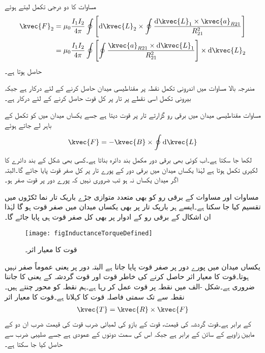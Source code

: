 مساوات  کا دو درجی تکمل لیتے ہوئے
\begin{gather}
 \begin{aligned}\label{مساوات_امالہ_تاروں_کے_مابین_قوت}
\kvec{F}_2 &=\mu_0 \frac{I_1 I_2}{4\pi } \oint\left[\dif \kvec{L}_2 \times \oint\frac{\dif \kvec{L}_1 \times \kvec{a}_{R21}}{R_{21}^2}\right]\\
&=\mu_0 \frac{I_1 I_2}{4\pi } \oint\left[ \oint\frac{ \kvec{a}_{R21}\times \dif \kvec{L}_1}{R_{21}^2}\right] \times \dif \kvec{L}_2
\end{aligned}
\end{gather}
حاصل ہوتا ہے۔

مندرجہ بالا مساوات میں اندرونی تکمل نقطہ  پر مقناطیسی میدان حاصل کرنے کے لئے درکار ہے جبکہ بیرونی تکمل اسی نقطے پر تار پر کل قوت حاصل کرنے کے لئے درکار ہے۔

مساوات   مقناطیسی میدان میں برقی رو گزارتے تار پر قوت دیتا ہے جسے یکساں میدان میں  کو تکمل کے باہر لے جاتے ہوئے
\begin{align*}
\kvec{F}=-\kvec{B} \times \oint \dif \kvec{L}
\end{align*}
 لکھا جا سکتا ہے۔اب کوئی بھی برقی دور مکمل بند دائرہ بناتا ہے۔کسی بھی شکل کے بند دائرے  کا لکیری تکمل  ہوتا ہے لہٰذا یکساں میدان میں برقی دور کے پورے تار پر کل صفر قوت پایا جائے گا۔البتہ اگر میدان یکساں نہ ہو تب ضروری نہیں کہ پورے دور پر قوت صفر ہو۔

مساوات  اور مساوات  کے برقی رو کو بھی متعدد متوازی جڑے باریک تار نما ٹکڑوں میں تقسیم کیا جا سکتا ہے۔ایسے ہر باریک تار پر بھی یکساں میدان میں صفر قوت ہو گا لہٰذا ان اشکال کے برقی رو کے ادوار پر بھی کل صفر قوت ہی پایا جائے گا۔
\begin{figure}
\centering
\texttt{[image: figInductanceTorqueDefined]}
\caption{قوت کا معیار اثر۔}
\label{شکل_امالہ_قوت_کا_معیار_اثر_تعریف}
\end{figure}

یکساں میدان میں پورے دور پر صفر قوت پایا جاتا ہے البتہ دور پر  یعنی  عموماً صفر نہیں ہوتا۔قوت کا معیار اثر حاصل کرنے کی خاطر قوت اور قوت گردشہ کے  یعنی  کا جاننا ضروری ہے۔شکل -الف میں نقطہ  پر قوت  عمل کر رہا ہے۔ہم نقطہ  کو محور چنتے ہیں۔ نقطہ  سے  تک سمتی فاصلہ  قوت کا   کہلاتا ہے۔قوت کا معیار اثر 
\begin{align}
\kvec{T}=\kvec{R} \times \kvec{F}
\end{align}
کے برابر ہے۔قوت گردشہ کی قیمت، قوت کے بازو کی لمبائی ضرب قوت کی قیمت ضرب ان دو کے مابین زاویے کے سائن کے برابر ہے جبکہ اس کی سمت دونوں کے عمودی ہے جسے صلیبی ضرب سے حاصل کیا جا سکتا ہے۔

